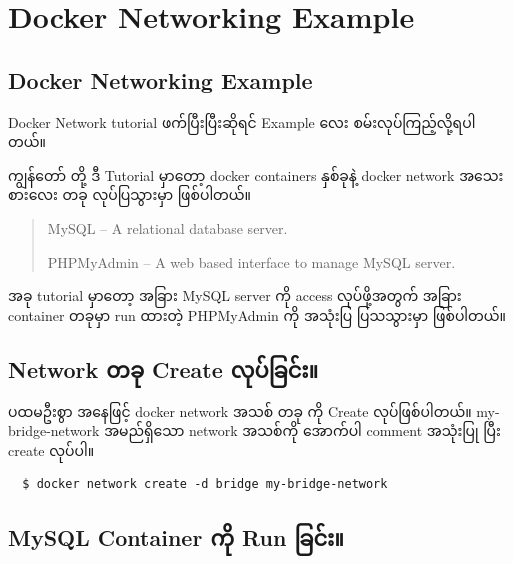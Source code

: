 \pagebreak

\hypertarget{docker-networking-example}{%
\section{Docker Networking Example}\label{docker-networking-example}}

\hypertarget{docker-networking-example-1}{%
\subsection{Docker Networking
Example}\label{docker-networking-example-1}}

Docker Network tutorial ဖက်ပြီးပြီးဆိုရင် Example လေး
စမ်းလုပ်ကြည့်လို့ရပါတယ်။

ကျွန်တော် တို့ ဒီ Tutorial မှာတော့ docker containers နှစ်ခုနဲ့ docker
network အသေးစားလေး တခု လုပ်ပြသွားမှာ ဖြစ်ပါတယ်။

\begin{quote}
MySQL -- A relational database server.

PHPMyAdmin -- A web based interface to manage MySQL server.
\end{quote}

အခု tutorial မှာတော့ အခြား MySQL server ကို access လုပ်ဖို့အတွက် အခြား
container တခုမှာ run ထားတဲ့ PHPMyAdmin ကို အသုံးပြ ပြသသွားမှာ ဖြစ်ပါတယ်။

\hypertarget{network-ux1010ux1001ux102f-create-ux101cux102fux1015ux103aux1001ux103cux1004ux103aux1038}{%
\subsection{Network တခု Create
လုပ်ခြင်း။}\label{network-ux1010ux1001ux102f-create-ux101cux102fux1015ux103aux1001ux103cux1004ux103aux1038}}

ပထမဦးစွာ အနေဖြင့် docker network အသစ် တခု ကို Create လုပ်ဖြစ်ပါတယ်။
my-bridge-network အမည်ရှိသော network အသစ်ကို အောက်ပါ comment အသုံးပြု
ပြီး create လုပ်ပါ။

\begin{verbatim}
  $ docker network create -d bridge my-bridge-network
\end{verbatim}

\hypertarget{mysql-container-ux1000ux102dux102f-run-ux1001ux103cux1004ux103aux1038}{%
\subsection{MySQL Container ကို Run
ခြင်း။}\label{mysql-container-ux1000ux102dux102f-run-ux1001ux103cux1004ux103aux1038}}

